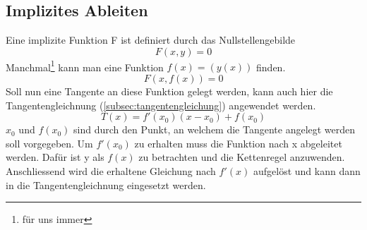 \subsection{Implizites Ableiten}
Eine implizite Funktion F ist definiert durch das Nullstellengebilde 
\[ F(x,y) = 0 \]
Manchmal\footnote{für uns immer} kann man eine Funktion $f(x) = (y(x))$ finden. 
\[ F(x, f(x)) = 0 \]
Soll nun eine Tangente an diese Funktion gelegt werden, kann auch hier die Tangentengleichnung (\ref{subsec:tangentengleichung}) angewendet werden. 
\[ T(x) = f'(x_0)(x - x_0) + f(x_0) \]
$x_0$ und $f(x_0)$ sind durch den Punkt, an welchem die Tangente angelegt werden soll vorgegeben. Um $f'(x_0)$ zu erhalten muss die Funktion nach x abgeleitet werden. Dafür ist y als $f(x)$ zu betrachten und die Kettenregel anzuwenden. Anschliessend wird die erhaltene Gleichung nach $f'(x)$ aufgelöst und kann dann in die Tangentengleichnung eingesetzt werden. 



\ifti
